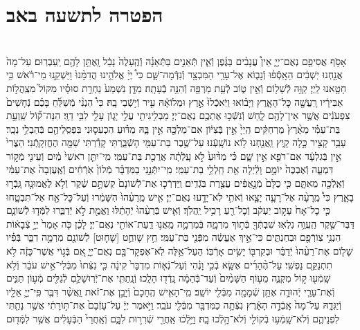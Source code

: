 \documentclass[twoside, openany, parskip=half, 11pt]{book}
\begin{document}
\begin{sometimes}
\begin{footnotesize}
\begin{multicols}{2}
\end{multicols}

\section*{הפטרה לתשעה באב}


\begin{multicols}{2}
 \\
אָסֹ֥ף אֲסִיפֵ֖ם נְאֻם־יְיָ֑ אֵין֩ עֲנָבִ֨ים בַּגֶּ֜פֶן וְֿאֵ֧ין תְּֿאֵנִ֣ים בַּתְּֿאֵנָ֗ה וְֿהֶֽעָלֶה֙ נָבֵ֔ל וָֽאֶתֵּ֥ן לָהֶ֖ם יַֽעַבְרֽוּם׃ עַל־מָה֙ אֲנַ֣חְנוּ יֽשְׁבִ֔ים הֵאָֽסְֿפ֗וּ וְֿנָב֛וֹא אֶל־עָרֵ֥י הַמִּבְצָ֖ר וְֿנִדְּֿמָה־שָּׁ֑ם כִּי֩ יְיָ֨ אֱלֹהֵ֤ינוּ הֲדִמָּ֨נוּ֙ וַיַּשְׁקֵ֣נוּ מֵי־רֹ֔אשׁ כִּ֥י חָטָ֖אנוּ לַֽיְיָ׃ קַוֵּ֥ה לְֿשָׁל֖וֹם וְֿאֵ֣ין ט֑וֹב לְֿעֵ֥ת מַרְפֵּ֖ה וְֿהִנֵּ֥ה בְֿעָתָֽה׃ מִדָּ֤ן נִשְׁמַע֙ נַחְרַ֣ת סוּסָ֗יו מִקּוֹל֙ מִצְֽהֲל֣וֹת אַבִּירָ֔יו רָֽעֲשָׁ֖ה כׇּל־הָאָ֑רֶץ וַיָּב֗וֹאוּ וַיֹּֽאכְֿלוּ֙ אֶ֣רֶץ וּמְלוֹאָ֔הּ עִ֖יר וְֿי֥שְֿׁבֵי בָֽהּ׃ כִּי֩ הִנְנִ֨י מְֿשַׁלֵּ֜חַ בָּכֶ֗ם נְֿחָשִׁים֙ צִפְעֹנִ֔ים אֲשֶׁ֥ר אֵין־לָהֶ֖ם לָ֑חַשׁ וְֿנִשְּֿׁכ֥וּ אֶתְכֶ֖ם נְאֻם־יְיָ׃ מַבְלִ֥יגִיתִ֖י עֲלֵ֣י יָג֑וֹן עָלַ֖י לִבִּ֥י דַוָּֽי׃ הִנֵּה־ק֞וֹל שַֽׁוְעַ֣ת בַּת־עַמִּ֗י מֵאֶ֨רֶץ֙ מַרְחַקִּ֔ים הַֽיְיָ֙ אֵ֣ין בְּֿצִיּ֔וֹן אִם־מַלְכָּ֖הּ אֵ֣ין בָּ֑הּ מַדּ֗וּעַ הִכְעִס֛וּנִי בִּפְסִֽלֵיהֶ֖ם בְּֿהַבְלֵ֥י נֵכָֽר׃ עָבַ֥ר קָצִ֖יר כָּ֣לָה קָ֑יִץ וַֽאֲנַ֖חְנוּ ל֥וֹא נוֹשָֽׁעְֿנוּ׃ עַל־שֶׁ֥בֶר בַּת־עַמִּ֖י הָשְֿׁבַּ֑רְתִּי קָדַ֕רְתִּי שַׁמָּ֖ה הֶחֱזִקָֽתְֿנִי׃ הַצֳרִי֙ אֵ֣ין בְּֿגִלְעָ֔ד אִם־רֹפֵ֖א אֵ֣ין שָׁ֑ם כִּ֗י מַדּ֨וּעַ֙ לֹ֣א עָֽלְֿתָ֔ה אֲרֻכַ֖ת בַּת־עַמִּֽי׃ מִֽי־יִתֵּ֤ן רֹאשִׁי֙ מַ֔יִם וְֿעֵינִ֖י מְֿק֣וֹר דִּמְעָ֑ה וְֿאֶבְכֶּה֙ יוֹמָ֣ם וָלַ֔יְלָה אֵ֖ת חַֽלְלֵ֥י בַת־עַמִּֽי׃ מִֽי־יִתְּֿנֵ֣נִי בַמִּדְבָּ֗ר מְֿלוֹן֙ אֹֽרְֿחִ֔ים וְֿאֶֽעֶזְבָה֙ אֶת־עַמִּ֔י וְֿאֵֽלְֿכָ֖ה מֵאִתָּ֑ם כִּ֤י כֻלָּם֙ מְֿנָ֣אֲפִ֔ים עֲצֶ֖רֶת בֹּֽגְֿדִֽים׃ וַֽיַּדְרְֿכ֤וּ אֶת־לְֿשׁוֹנָם֙ קַשְׁתָּ֣ם שֶׁ֔קֶר וְֿלֹ֥א לֶאֱמוּנָ֖ה גָּֽבְֿר֣וּ בָאָ֑רֶץ כִּי֩ מֵֽרָעָ֨ה אֶל־רָעָ֧ה יָצָ֛אוּ וְֿאֹתִ֥י לֹֽא־יָדָ֖עוּ נְאֻם־יְיָ׃ אִ֤ישׁ מֵֽרֵעֵ֨הוּ֙ הִשָּׁמֵ֔רוּ וְֿעַל־כׇּל־אָ֖ח אַל־תִּבְטָ֑חוּ כִּ֤י כׇל־אָח֙ עָק֣וֹב יַעְקֹ֔ב וְֿכׇל־רֵ֖עַ רָכִ֥יל יַֽהֲלֹֽךְ׃ וְֿאִ֤ישׁ בְּֿרֵעֵ֨הוּ֙ יְֿהָתֵ֔לּוּ וֶאֱמֶ֖ת לֹ֣א יְֿדַבֵּ֑רוּ לִמְּֿד֧וּ לְֿשׁוֹנָ֛ם דַּבֶּר־שֶׁ֖קֶר הַֽעֲוֵ֥ה נִלְאֽוּ׃ שִׁבְתְּֿךָ֖ בְּֿת֣וֹךְ מִרְמָ֑ה בְּֿמִרְמָ֛ה מֵֽאֲנ֥וּ דַֽעַת־אוֹתִ֖י נְאֻם־יְיָ׃ לָכֵ֗ן כֹּ֤ה אָמַר֙ יְיָ֣ צְֿבָא֔וֹת הִנְנִ֥י צֽוֹרְֿפָ֖ם וּבְחַנְתִּ֑ים כִּי־אֵ֣יךְ אֶעֱשֶׂ֔ה מִפְּֿנֵ֖י בַּת־עַמִּֽי׃ חֵ֥ץ שָׁוחֻ֛ט [שָׁח֛וּט] לְֿשׁוֹנָ֖ם מִרְמָ֣ה דִבֵּ֑ר בְּֿפִ֗יו שָׁל֤וֹם אֶת־רֵעֵ֨הוּ֙ יְֿדַבֵּ֗ר וּבְקִרְבּ֖וֹ יָשִׂ֥ים אָרְֿבּֽוֹ׃ הַעַל־אֵ֥לֶּה לֹֽא־אֶפְקָד־בָּ֖ם נְאֻם־יְיָ֑ אִ֚ם בְּֿג֣וֹי אֲשֶׁר־כָּזֶ֔ה לֹ֥א תִתְנַקֵּ֖ם נַפְשִֽׁי׃ עַל־הֶ֨הָרִ֜ים אֶשָּׂ֧א בְֿכִ֣י וָנֶ֗הִי וְֿעַל־נְֿא֤וֹת מִדְבָּר֙ קִינָ֔ה כִּ֤י נִצְּֿתוּ֙ מִבְּֿלִי־אִ֣ישׁ עֹבֵ֔ר וְֿלֹ֥א שָֽׁמְֿע֖וּ ק֣וֹל מִקְנֶ֑ה מֵע֤וֹף הַשָּׁמַ֨יִם֙ וְֿעַד־בְּֿֿהֵמָ֔ה נָֽדְֿד֖וּ הָלָֽכוּ׃ וְֿנָֽתַתִּ֧י אֶת־יְֿרֽוּשָׁלַ֛םִ לְֿגַלִּ֖ים מְֿע֣וֹן תַּנִּ֑ים וְֿאֶת־עָרֵ֧י יְֿהוּדָ֛ה אֶתֵּ֥ן שְֿׁמָמָ֖ה מִבְּֿלִ֖י יוֹשֵֽׁב׃ מִֽי־הָאִ֤ישׁ הֶֽחָכָם֙ וְֿיָבֵ֣ן אֶת־זֹ֔את וַֽאֲשֶׁ֨ר דִּבֶּ֧ר פִּֽי־יְיָ֛ אֵלָ֖יו וְֿיַגִּדָ֑הּ עַל־מָה֙ אָֽבְֿדָ֣ה הָאָ֔רֶץ נִצְּֿתָ֥ה כַמִּדְבָּ֖ר מִבְּֿלִ֖י עֹבֵֽר׃ וַיֹּ֣אמֶר יְיָ֔ עַל־עָזְֿבָם֙ אֶת־תּ֣וֹרָתִ֔י אֲשֶׁ֥ר נָתַ֖תִּי לִפְנֵיהֶ֑ם וְֿלֹא־שָֽׁמְֿע֥וּ בְֿקוֹלִ֖י וְֿלֹא־הָ֥לְֿכוּ בָֽהּ׃ וַיֵּ֣לְֿכ֔וּ אַֽחֲרֵ֖י שְֿׁרִר֣וּת לִבָּ֑ם וְֿאַֽחֲרֵי֙ הַבְּֿעָלִ֔ים אֲשֶׁ֥ר לִמְּֿד֖וּם 
\end{multicols}
\end{footnotesize}
\end{sometimes}
\end{document}
